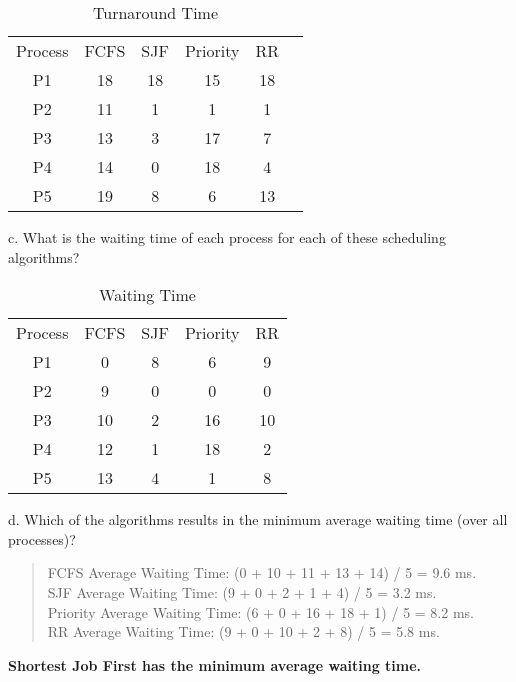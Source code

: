 \documentclass[letterpaper, 10pt,DIV=13]{scrartcl}
\numberwithin{equation}{section} %
\numberwithin{figure}{section} %
\numberwithin{table}{section} %
\begin{document}
\begin{table}[H]
    \centering
    \begin{tabular}{cccccc}
         Process&  FCFS&  SJF&  Priority&  RR& \\
         P1&  18&  18&  15&  18& \\
         P2&  11&  1&  1&  1& \\
         P3&  13&  3&  17&  7& \\
         P4&  14&  0&  18&  4& \\
         P5& 19&  8& 6& 13& \\
    \end{tabular}
    \caption{Turnaround Time}
    \label{tab:my_label}
\end{table}
c. What is the waiting time of each process for each of these scheduling algorithms? \\

\begin{table}[H]
    \centering
    \begin{tabular}{ccccc}
        Process & FCFS & SJF & Priority &RR \\
         P1&  0&  8&  6& 9\\
         P2&  9&  0&  0& 0\\
         P3&  10&  2&  16& 10\\
         P4&  12&  1&  18&2 \\
         P5&  13&  4&  1& 8\\
    \end{tabular}
    \caption{Waiting Time}
    \label{tab:my_label}
\end{table}
d. Which of the algorithms results in the minimum average waiting time (over all processes)?

\begin{quote}
    FCFS Average Waiting Time: (0 + 10 + 11 + 13 + 14) / 5 = 9.6 ms.\\
    SJF Average Waiting Time: (9 + 0 + 2 + 1 + 4) / 5 = 3.2 ms.\\
    Priority Average Waiting Time: (6 + 0 + 16 + 18 + 1) / 5 = 8.2 ms.\\
    RR Average Waiting Time: (9 + 0 + 10 + 2 + 8) / 5 = 5.8 ms.
\end{quote}
\textbf{Shortest Job First has the minimum average waiting time.} 



\end{document}
